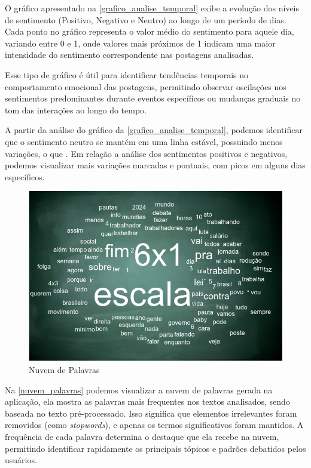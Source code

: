 \documentclass[
	12pt,				%
	oneside,			%
	a4paper,			%
	english,			%
	french,				%
	spanish,			%
	brazil				%
	]{abntex2}
\begin{document}
O gráfico apresentado na \autoref{grafico_analise_temporal} exibe a
evolução dos níveis de sentimento (Positivo, Negativo e Neutro) ao longo
de um período de dias. Cada ponto no gráfico representa o valor médio do
sentimento para aquele dia, variando entre 0 e 1, onde valores mais
próximos de 1 indicam uma maior intensidade do sentimento correspondente
nas postagens analisadas.

Esse tipo de gráfico é útil para identificar tendências temporais no
comportamento emocional das postagens, permitindo observar oscilações
nos sentimentos predominantes durante eventos específicos ou mudanças
graduais no tom das interações ao longo do tempo.

A partir da análise do gráfico da \autoref{grafico_analise_temporal},
podemos identificar que o sentimento neutro se mantém em uma linha
estável, possuindo menos variações, o que . Em relação a análise dos
sentimentos positivos e negativos, podemos visualizar mais variações
marcadas e pontuais, com picos em alguns dias específicos.

\begin{figure}[htbp]
\hypertarget{nuvem_palavras}{%
\caption{Nuvem de Palavras}\label{nuvem_palavras}
\begin{center}
\includegraphics[scale=0.4]{imagens/sentilytics/estudo-caso/bag_of_words.png}
\end{center}
}
\end{figure}

Na \autoref{nuvem_palavras} podemos visualizar a nuvem de palavras
gerada na aplicação, ela mostra as palavras mais frequentes nos textos
analisados, sendo baseada no texto pré-processado. Isso significa que
elementos irrelevantes foram removidos (como \emph{stopwords}), e apenas
os termos significativos foram mantidos. A frequência de cada palavra
determina o destaque que ela recebe na nuvem, permitindo identificar
rapidamente os principais tópicos e padrões debatidos pelos usuários.
\end{document}
